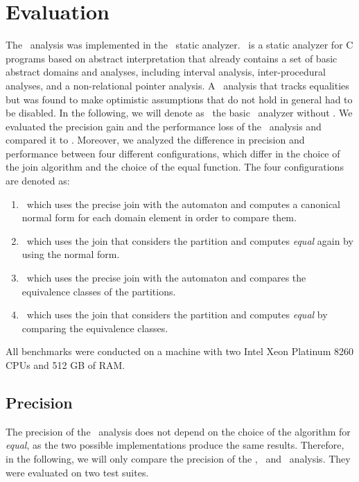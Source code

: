 \chapter{Evaluation}\label{chapter:evaluation}


The \cpo\ analysis was implemented in the \goblint\ static analyzer.
\goblint\ is a static analyzer for C programs based on abstract interpretation
that already contains a set of basic abstract domains and analyses,
including interval analysis, inter-procedural analyses, and a non-relational pointer analysis.
A \goblint\ analysis that tracks equalities but was found to make optimistic assumptions that do not hold in general had to be disabled.
In the following, we will denote as \base\ the basic \goblint\ analyzer without \cpo.
We evaluated the precision gain and the performance loss of the \cpo\ analysis and compared it to \base.
Moreover, we analyzed the difference in precision and performance between four different
configurations, which differ in the choice of the join algorithm and the choice of the equal function.
The four configurations are denoted as:
\begin{enumerate}
    \item \cpou\, which uses the precise join with the automaton and computes a canonical normal form for each domain element in order to compare them.
    \item \cpod\, which uses the join that considers the partition and computes \emph{equal} again by using the normal form.
    \item \cpot\, which uses the precise join with the automaton and compares the equivalence classes of the partitions.
    \item \cpoq\, which uses the join that considers the partition and computes \emph{equal} by comparing the equivalence classes.
\end{enumerate}
All benchmarks were conducted on a machine with two Intel Xeon Platinum 8260 CPUs and 512 GB of RAM.

\section{Precision}

The precision of the \cpo\ analysis does not depend on the choice of the algorithm for \emph{equal}, as the two possible implementations produce the same results.
Therefore, in the following, we will only compare the precision of the \cpou, \cpod\, and \base\ analysis.
They were evaluated on two test suites.

